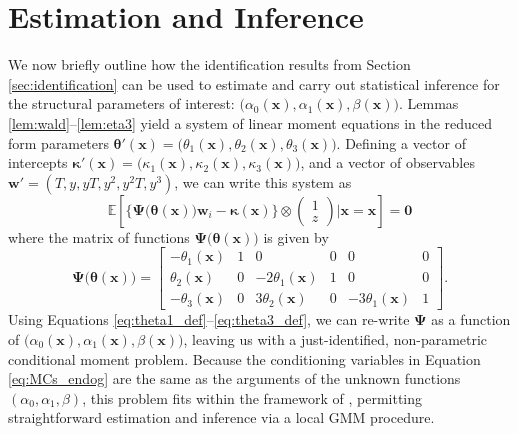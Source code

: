 \section{Estimation and Inference}
\label{sec:inference}
We now briefly outline how the identification results from Section \ref{sec:identification} can be used to estimate and carry out statistical inference for the structural parameters of interest: $\big(\alpha_0(\mathbf{x}), \alpha_1(\mathbf{x}), \beta(\mathbf{x})\big)$.
Lemmas \ref{lem:wald}--\ref{lem:eta3} yield a system of linear moment equations in the reduced form parameters $\boldsymbol{\theta}'(\mathbf{x}) = \big(\theta_1(\mathbf{x}), \theta_2(\mathbf{x}),\theta_3(\mathbf{x})\big)$.
Defining a vector of intercepts $\boldsymbol{\kappa}'(\mathbf{x}) = \big(\kappa_1(\mathbf{x}), \kappa_2(\mathbf{x}), \kappa_3(\mathbf{x})\big)$,
and a vector of observables $\mathbf{w}' = (T, y, yT, y^2, y^2 T, y^3)$, we can write this system as
\begin{equation}
\mathbb{E}\left[
  \bigg\{\boldsymbol{\Psi}\big(\boldsymbol{\theta}(\mathbf{x})\big)\mathbf{w}_i - \boldsymbol{\kappa}(\mathbf{x})\bigg\} \otimes 
\left(
\begin{array}{c}
  1 \\ z
\end{array}\right)\Bigg| \mathbf{x} = \boldsymbol{x}
\right] = \mathbf{0}
\label{eq:MCs_endog}
\end{equation}
where the matrix of functions $\boldsymbol{\Psi}\big(\boldsymbol{\theta}(\mathbf{x})\big)$ is given by 
\[
  \boldsymbol{\Psi}\big(\boldsymbol{\theta}(\mathbf{x})\big) = 
  \left[
  \begin{array}{rrrrrr}
    -\theta_1(\mathbf{x}) & 1 & 0 & 0 & 0 & 0\\
    \theta_2(\mathbf{x}) & 0 & -2\theta_1(\mathbf{x}) & 1 & 0 & 0\\ 
    -\theta_3(\mathbf{x}) & 0 & 3\theta_2(\mathbf{x}) & 0 & -3\theta_1(\mathbf{x}) & 1
\end{array}\right].
\]
Using Equations \ref{eq:theta1_def}--\ref{eq:theta3_def}, we can re-write  $\mathbf{\Psi}$ as a function of $\big(\alpha_0(\mathbf{x}), \alpha_1(\mathbf{x}), \beta(\mathbf{x})\big)$, leaving us with a just-identified, non-parametric conditional moment problem.
Because the conditioning variables in Equation \ref{eq:MCs_endog} are the same as the arguments of the unknown functions $(\alpha_0, \alpha_1, \beta)$, this problem fits within the framework of \cite{Lewbel2007}, permitting straightforward estimation and inference via a local GMM procedure. 
